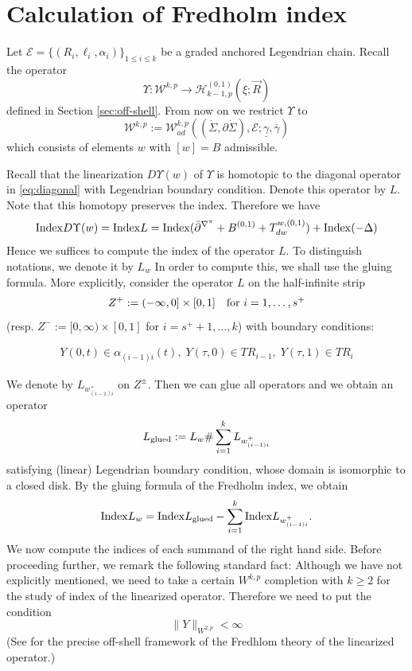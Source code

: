 \documentclass[reqno]{amsart}
\newcommand{\del}{\partial}
\newcommand{\be}{\begin{equation}}
\newcommand{\ee}{\end{equation}}
\newcommand{\bea}{\begin{eqnarray}}
\newcommand{\eea}{\end{eqnarray}}
\theoremstyle{theorem}
\theoremstyle{definition}
\numberwithin{equation}{section}
\def\CH{{\mathcal H}}
\def\CW{{\mathcal W}}
\begin{document}
\section{Calculation of Fredholm index }
\label{sec:index}

Let $\mathcal{E} = \{(R_i,\ell_i,\alpha_i)\}_{1 \leq i \leq k}$ be a graded anchored Legendrian chain. Recall the operator
$$\Upsilon: \CW^{k,p} \to \CH^{(0,1)}_{k-1,p} (\xi;\vec R) $$
defined in Section \ref{sec:off-shell}. From now on we restrict $\Upsilon$ to
$$
\CW^{k,p} := \CW^{k,p}_{ad}((\dot{\Sigma},\del \dot{\Sigma}), \mathcal{E}; \underline \gamma, \overline \gamma)
$$
which consists of elements $w$ with $[w]=B$ admissible.

Recall that the linearization $D\Upsilon(w)$ of $\Upsilon$ is homotopic to the diagonal operator in \eqref{eq:diagonal}
with Legendrian boundary condition.
Denote this operator by $L$. Note that this homotopy preserves the index. Therefore we have
$$
{\rm Index }D\Upsilon(w) = {\rm Index } L = {\rm Index }(\bar{\partial}^{\nabla^\pi}+B^{(0,1)}
+T^{w,(0,1)}_{dw}) + {\rm Index }(-\Delta)
$$
Hence we suffices to compute the index of the operator $L$. To distinguish notations, we denote it by $L_w$ In order to compute this, we shall use the gluing formula. More explicitly, consider the operator $L$ on the half-infinite strip
$$
Z^+ := (-\infty,0]\times[0,1] \quad \text{for $ i=1,\ldots,s^+$}
$$
(resp. $Z^- := [0,\infty)\times[0,1]$ for $i=s^++1,\ldots,k$) with boundary conditions:

\bea\label{eq:half-strip-leg-bdry}
Y(0,t)\in \alpha_{(i-1)i}(t), \; Y(\tau,0)\in TR_{i-1}, \; Y(\tau,1)\in TR_i
\eea


We denote by  $L_{w_{(i-1)i}^+}$ on $Z^\pm$. Then we can glue all operators and we obtain an operator
$$
L_{\rm glued} := L_w \# \sum_{i=1}^{k}L_{w_{(i-1)i}^+}
$$
satisfying (linear) Legendrian boundary condition,
whose domain is isomorphic to a closed disk.
By the gluing formula of the Fredholm index, we obtain
$$
{\rm Index } L_w = {\rm Index }L_{\rm glued} - \sum_{i=1}^{k}{\rm Index }L_{w_{(i-1)i}^+}.
$$
We now compute the indices of each summand of the right hand side.
Before proceeding further, we remark the following
standard fact:
Although we have not explicitly mentioned, we need to take a certain $W^{k,p}$
completion with $k \geq 2$ for the study of index of the linearized operator.
Therefore we need to put the condition
\be\label{eq:finiteW2pnorm}
\|Y\|_{W^{2,p}} < \infty
\ee
(See \cite{oh:contacton-transversality} for the precise off-shell framework of
the Fredhlom theory of the linearized operator.)
\end{document}
